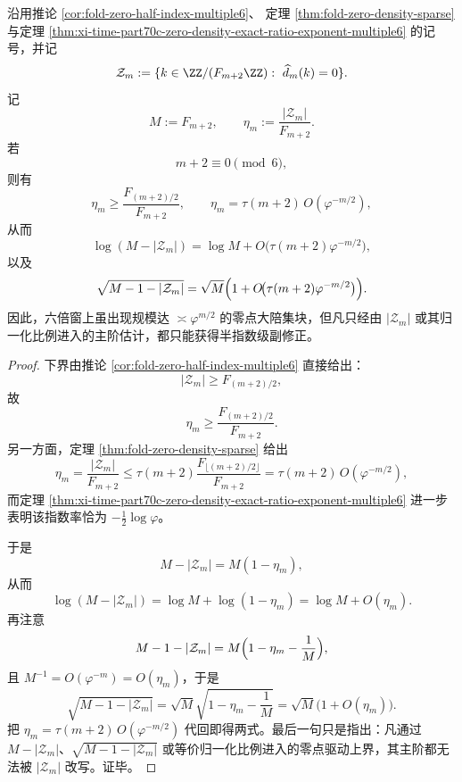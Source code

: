 \begin{theorem}[算术零点块具有绝对宏观性而归一化静默]\label{thm:xi-time-part9zo-zero-block-macroscopic-normalized-silent}
沿用推论 \ref{cor:fold-zero-half-index-multiple6}、
定理 \ref{thm:fold-zero-density-sparse}
与定理 \ref{thm:xi-time-part70c-zero-density-exact-ratio-exponent-multiple6} 的记号，并记
\[
\mathcal Z_m:=\{k\in \ZZ/(F_{m+2}\ZZ):\ \widehat d_m(k)=0\}.
\]
记
\[
M:=F_{m+2},
\qquad
\eta_m:=\frac{|\mathcal Z_m|}{F_{m+2}}.
\]
若
\[
m+2\equiv 0\pmod 6,
\]
则有
\[
\eta_m\ge \frac{F_{(m+2)/2}}{F_{m+2}},
\qquad
\eta_m=\tau(m+2)\,O(\varphi^{-m/2}),
\]
从而
\[
\log(M-|\mathcal Z_m|)
=
\log M+O\!\bigl(\tau(m+2)\varphi^{-m/2}\bigr),
\]
以及
\[
\sqrt{M-1-|\mathcal Z_m|}
=
\sqrt M\Bigl(1+O\!\bigl(\tau(m+2)\varphi^{-m/2}\bigr)\Bigr).
\]
因此，六倍窗上虽出现规模达 \(\asymp \varphi^{m/2}\) 的零点大陪集块，但凡只经由 \(|\mathcal Z_m|\) 或其归一化比例进入的主阶估计，都只能获得半指数级副修正。
\end{theorem}
\begin{proof}
下界由推论 \ref{cor:fold-zero-half-index-multiple6} 直接给出：
\[
|\mathcal Z_m|\ge F_{(m+2)/2},
\]
故
\[
\eta_m\ge \frac{F_{(m+2)/2}}{F_{m+2}}.
\]
另一方面，定理 \ref{thm:fold-zero-density-sparse} 给出
\[
\eta_m=\frac{|\mathcal Z_m|}{F_{m+2}}
\le
\tau(m+2)\frac{F_{\lfloor (m+2)/2\rfloor}}{F_{m+2}}
=
\tau(m+2)\,O(\varphi^{-m/2}),
\]
而定理 \ref{thm:xi-time-part70c-zero-density-exact-ratio-exponent-multiple6} 进一步表明该指数率恰为 \(-\frac12\log\varphi\)。

于是
\[
M-|\mathcal Z_m|=M(1-\eta_m),
\]
从而
\[
\log(M-|\mathcal Z_m|)
=
\log M+\log(1-\eta_m)
=
\log M+O(\eta_m).
\]
再注意
\[
M-1-|\mathcal Z_m|
=
M\Bigl(1-\eta_m-\frac1M\Bigr),
\]
且 \(M^{-1}=O(\varphi^{-m})=O(\eta_m)\)，于是
\[
\sqrt{M-1-|\mathcal Z_m|}
=
\sqrt M\sqrt{1-\eta_m-\frac1M}
=
\sqrt M\bigl(1+O(\eta_m)\bigr).
\]
把 \(\eta_m=\tau(m+2)\,O(\varphi^{-m/2})\) 代回即得两式。最后一句只是指出：凡通过 \(M-|\mathcal Z_m|\)、\(\sqrt{M-1-|\mathcal Z_m|}\) 或等价归一化比例进入的零点驱动上界，其主阶都无法被 \(|\mathcal Z_m|\) 改写。证毕。
\end{proof}

